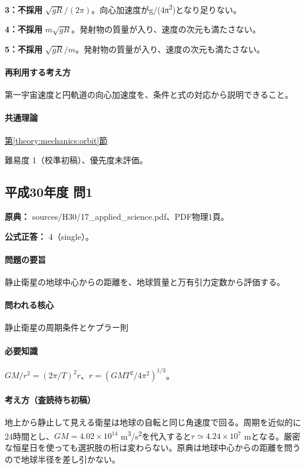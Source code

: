 \noindent\textbf{3：不採用} \(\sqrt{gR}/(2\pi)\)。向心加速度がg/(4π\textsuperscript{2})となり足りない。\par

\noindent\textbf{4：不採用} \(m\sqrt{gR}\)。発射物の質量が入り、速度の次元も満たさない。\par

\noindent\textbf{5：不採用} \(\sqrt{gR}/m\)。発射物の質量が入り、速度の次元も満たさない。\par

\paragraph{再利用する考え方} 第一宇宙速度と円軌道の向心加速度を、条件と式の対応から説明できること。

\paragraph{共通理論} \hyperref[theory:mechanics:orbit]{第\ref*{theory:mechanics:orbit}節}

\par 難易度 1（校準初稿）、優先度未評価。

\subsection{平成30年度 問1}
\label{q:h30-reg-applied-01}

\noindent\textbf{原典：} sources/H30/17\_applied\_science.pdf、PDF物理1頁。

\textbf{公式正答：} 4（single）。

\paragraph{問題の要旨} 静止衛星の地球中心からの距離を、地球質量と万有引力定数から評価する。

\paragraph{問われる核心} 静止衛星の周期条件とケプラー則

\paragraph{必要知識} \(GM/r^2=(2\pi/T)^2r\)、\(r=(GMT^2/4\pi^2)^{1/3}\)。

\paragraph{考え方（査読待ち初稿）} 地上から静止して見える衛星は地球の自転と同じ角速度で回る。周期を近似的に24時間とし、\(GM=4.02\times10^{14}\) m\textsuperscript{3}/s\textsuperscript{2}を代入すると\(r\simeq4.24\times10^7\) mとなる。厳密な恒星日を使っても選択肢の桁は変わらない。原典は地球中心からの距離を問うので地球半径を差し引かない。

